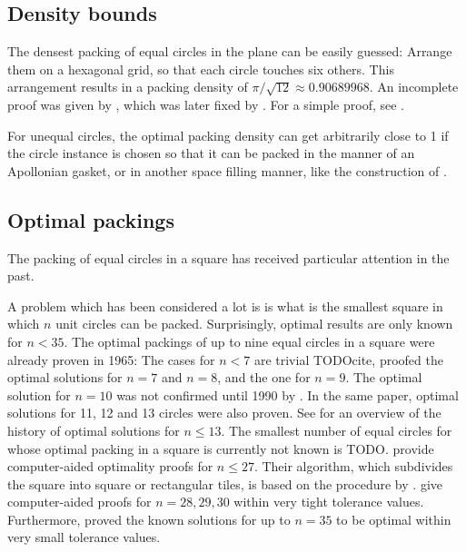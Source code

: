 \documentclass[a4paper,style=print,bibliography=totoc,nexus,lnum,extramargin]{tubsbook}
\begin{document}
\subsection{Density bounds}

The densest packing of equal circles in the plane can be easily guessed: Arrange them on a hexagonal grid, so that each circle touches six others. This arrangement results in a packing density of $\pi/\sqrt{12} \approx 0.90689968$. An incomplete proof was given by \textcite{thue1892om}, which was later fixed by \textcite{fejestoth1940uber}. For a simple proof, see \cite{CW2010simple}.

For unequal circles, the optimal packing density can get arbitrarily close to 1 if the circle instance is chosen so that it can be packed in the manner of an Apollonian gasket, or in another space filling manner, like the construction of \textcite{bourke2011random}.

\subsection{Optimal packings}

The packing of equal circles in a square has received particular attention in the past.

A problem which has been considered a lot is is what is the smallest square in which $n$ unit circles can be packed. Surprisingly, optimal results are only known for $n < 35$.
The optimal packings of up to nine equal circles in a square were already proven in 1965: The cases for $n < 7$ are trivial TODOcite,
\textcite{schaer1965densest} proofed the optimal solutions for $n = 7$ and $n = 8$, and \textcite{SM1965geometric} the one for $n = 9$.
The optimal solution for $n = 10$ was not confirmed until 1990 by \textcite{DPW1990optimal}. In the same paper, optimal solutions for 11, 12 and 13 circles were also proven.
See \textcite{WMP1994history} for an overview of the history of optimal solutions for $n \le 13$.
The smallest number of equal circles for whose optimal packing in a square is currently not known is TODO.
\textcite{NO1998more} provide computer-aided optimality proofs for $n \le 27$. Their algorithm, which subdivides the square into square or rectangular tiles, is based on the procedure by \textcite{PWMD1992packing}.
\textcite{MC2005new} give computer-aided proofs for $n=28,29,30$ within very tight tolerance values.
Furthermore, \textcite{LR2002packing} proved the known solutions for up to $n=35$ to be optimal within very small tolerance values.
\end{document}
